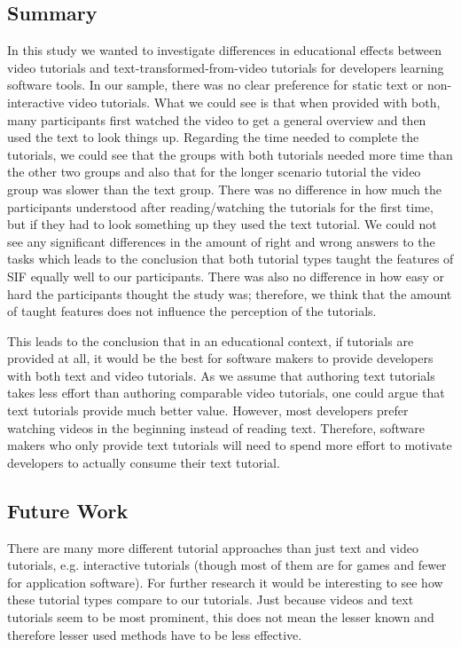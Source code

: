 \subsection{Summary} 
In this study we wanted to investigate differences in educational effects between video tutorials and text-transformed-from-video tutorials for developers learning software tools. 
In our sample, there was no clear preference for static text or non-interactive video tutorials. What we could see is that when provided with both, many participants first watched the video to get a general overview and then used the text to look things up. 
Regarding the time needed to complete the tutorials, we could see that the groups with both tutorials needed more time than the other two groups and also that for the longer scenario tutorial the video group was slower than the text group. 
There was no difference in how much the participants understood after reading/watching the tutorials for the first time, but if they had to look something up they used the text tutorial. We could not see any significant differences in the amount of right and wrong answers to the tasks which leads to the conclusion that both tutorial types taught the features of SIF equally well to our participants. There was also no difference in how easy or hard the participants thought the study was; therefore, we think that the amount of taught features does not influence the perception of the tutorials. 


This leads to the conclusion that in an educational context, if tutorials are provided at all, it would be the best for software makers to provide developers with both text and video tutorials. As we assume that authoring text tutorials takes less effort than authoring comparable video tutorials, one could argue that text tutorials provide much better value. However, most developers prefer watching videos in the beginning instead of reading text. Therefore, software makers who only provide text tutorials will need to spend more effort to motivate developers to actually consume their text tutorial.


\subsection{Future Work} 
There are many more different tutorial approaches than just text and video tutorials, e.g. interactive tutorials (though most of them are for games and fewer for application software). For further research it would be interesting to see how these tutorial types compare to our tutorials.  Just because videos and text tutorials seem to be most prominent, this does not mean the lesser known and therefore lesser used methods have to be less effective. 

